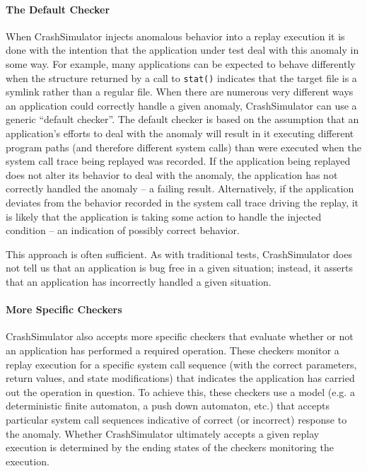     
    \paragraph{The Default Checker}

    When CrashSimulator injects anomalous behavior into a replay execution it is
    done with the intention that the application under test deal with this
    anomaly in some way. For example, many applications
    can be expected to behave differently when
    the structure returned by a call to {\tt stat()} indicates that the target file
    is a symlink rather than a regular file.
    When there are numerous very different ways an
    application could correctly handle a given anomaly, CrashSimulator 
    can use a generic ``default checker''.  The default checker
    is based on the assumption that an application's efforts to deal with the anomaly
    will result in it executing different program paths (and therefore different
    system calls) than were executed when the system call trace being replayed
    was recorded.  If the application being replayed does not
    alter its behavior to deal with the anomaly, the application has not
    correctly handled the anomaly -- a failing result.  Alternatively, if the
    application deviates from the behavior recorded in the system call trace
    driving the replay, it is likely that the application is taking some action
    to handle the injected condition -- an indication of possibly correct
    behavior.

    This approach is often sufficient. %
    As
    with traditional tests, CrashSimulator does not tell us that an application is
    bug free in a given situation; instead, it asserts that an application
    has incorrectly handled a given situation.
    

    \paragraph{More Specific Checkers}

    CrashSimulator also accepts more specific checkers that evaluate whether or
    not an application has performed a required operation.  These checkers
    monitor a replay execution for a specific system call sequence (with the
    correct parameters, return values, and state modifications) that indicates
    the application has carried out the operation in question.  To achieve this,
    these checkers use a model (e.g. a deterministic finite
    automaton, a push down automaton, etc.) that accepts particular system
    call sequences indicative of correct (or incorrect) response
    to the anomaly.  Whether CrashSimulator
    ultimately accepts a given replay execution is determined by the ending
    states of the checkers monitoring the execution.


